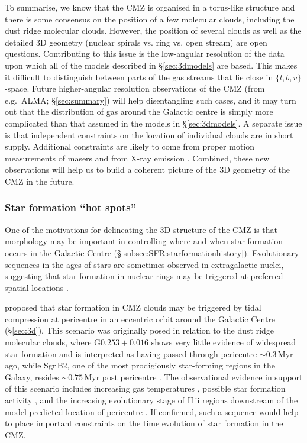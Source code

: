 To summarise, we know that the CMZ is organised in a torus-like structure and there is some consensus on the position of a few molecular clouds, including the dust ridge molecular clouds. 
However, the position of several clouds as well as the detailed 3D geometry (nuclear spirals vs. ring vs. open stream) are open questions.
Contributing to this issue is the low-angular resolution of the data upon which all of the models described in \S\ref{sec:3dmodels} are based. 
This makes it difficult to distinguish between parts of the gas streams that lie close in $\{l,b,v\}$-space. 
Future higher-angular resolution observations of the CMZ (from e.g.\ ALMA; \S\ref{sec:summary}) will help disentangling such cases, and it may turn out that the distribution of gas around the Galactic centre is simply more complicated than that assumed in the models in \S\ref{sec:3dmodels}. 
A separate issue is that independent constraints on the location of individual clouds are in short supply. 
Additional constraints are likely to come from proper motion measurements of masers \citep[e.g.][]{Immer2020} and from X-ray emission \citep[e.g.][]{Chuard2018}. 
Combined, these new observations will help us to build a coherent picture of the 3D geometry of the CMZ in the future.

\subsubsection{Star formation ``hot spots''} 
\label{sec:sfhotspots}

One of the motivations for delineating the 3D structure of the CMZ is that morphology may be important in controlling where and when star formation occurs in the Galactic Centre (\S\ref{subsec:SFR:starformationhistory}). 
Evolutionary sequences in the ages of stars are sometimes observed in extragalactic nuclei, suggesting that star formation in nuclear rings may be triggered at preferred spatial locations \citep{Ryder2001, Allard2006, Mazzuca2008, Boker2008, Hennig2018, Callanan2021}. 

\citet{Longmore2013a} proposed that star formation in CMZ clouds may be triggered by tidal compression at pericentre in an eccentric orbit around the Galactic Centre (\S\ref{sec:3d}). 
This scenario was originally posed in relation to the dust ridge molecular clouds, where G$0.253+0.016$ shows very little evidence of widespread star formation and is interpreted as having passed through pericentre $\sim0.3$\,Myr ago, while Sgr\,B2, one of the most prodigiously star-forming regions in the Galaxy, resides $\sim0.75$\,Myr post pericentre \citep[Fig.~\ref{fig:sketch}][]{Kruijssen2015}. The observational evidence in support of this scenario includes increasing gas temperatures \citep{Ginsburg2016, Krieger2017}, possible star formation activity \citep{Immer2012a, Rathborne2014a, Ginsburg2018b, Walker2018, Barnes2019}, and the increasing evolutionary stage of H\,{\sc ii} regions \citep{Barnes2020b} downstream of the model-predicted location of pericentre \citep{Kruijssen2015}. If confirmed, such a sequence would help to place important constraints on the time evolution of star formation in the CMZ. 

